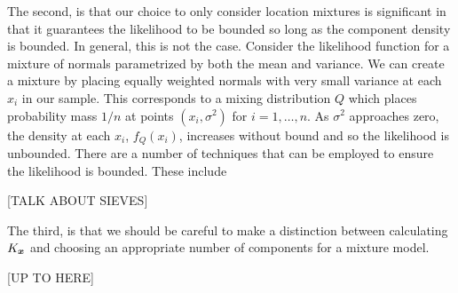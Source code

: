 	The second, is that our choice to only consider location mixtures is significant in that it guarantees the likelihood to be bounded so long as the component density is bounded. In general, this is not the case. Consider the likelihood function for a mixture of normals parametrized by both the mean and variance. We can create a mixture by placing equally weighted normals with very small variance at each $x_i$ in our sample. This corresponds to a mixing distribution $Q$ which places probability mass $1/n$ at points $(x_i, \sigma^2)$ for $i = 1, \dots, n$. As $\sigma^2$ approaches zero, the density at each $x_i$, $f_Q(x_i)$, increases without bound and so the likelihood is unbounded. There are a number of techniques that can be employed to ensure the likelihood is bounded. These include 

	[TALK ABOUT SIEVES]

	The third, is that we should be careful to make a distinction between calculating $K_{\bm{{x}}}$ and choosing an appropriate number of components for a mixture model. 



	[UP TO HERE]



	
